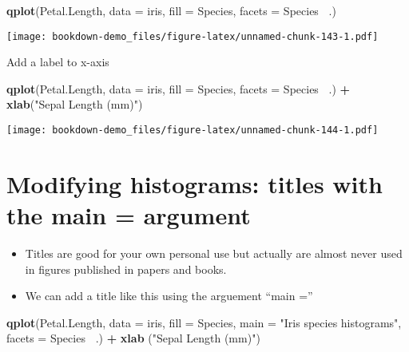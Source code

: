 \documentclass[]{book}
\newenvironment{Shaded}{\begin{snugshade}}{\end{snugshade}}
\newcommand{\KeywordTok}[1]{\textcolor[rgb]{0.13,0.29,0.53}{\textbf{#1}}}
\newcommand{\DataTypeTok}[1]{\textcolor[rgb]{0.13,0.29,0.53}{#1}}
\newcommand{\StringTok}[1]{\textcolor[rgb]{0.31,0.60,0.02}{#1}}
\newcommand{\OperatorTok}[1]{\textcolor[rgb]{0.81,0.36,0.00}{\textbf{#1}}}
\newcommand{\NormalTok}[1]{#1}
\providecommand{\tightlist}{%
  \setlength{\itemsep}{0pt}\setlength{\parskip}{0pt}}
\theoremstyle{definition}
\theoremstyle{definition}
\theoremstyle{definition}
\theoremstyle{remark}
\begin{document}
\begin{Shaded}
\begin{Highlighting}[]
\KeywordTok{qplot}\NormalTok{(Petal.Length,}
      \DataTypeTok{data =}\NormalTok{ iris,}
      \DataTypeTok{fill =}\NormalTok{ Species,}
      \DataTypeTok{facets =}\NormalTok{ Species }\OperatorTok{~}\NormalTok{.) }
\end{Highlighting}
\end{Shaded}

\texttt{[image: bookdown-demo\_files/figure-latex/unnamed-chunk-143-1.pdf]}

Add a label to x-axis

\begin{Shaded}
\begin{Highlighting}[]
\KeywordTok{qplot}\NormalTok{(Petal.Length,}
      \DataTypeTok{data =}\NormalTok{ iris,}
      \DataTypeTok{fill =}\NormalTok{ Species,}
      \DataTypeTok{facets =}\NormalTok{ Species }\OperatorTok{~}\NormalTok{.) }\OperatorTok{+}\StringTok{  }
\StringTok{  }\KeywordTok{xlab}\NormalTok{(}\StringTok{"Sepal Length (mm)"}\NormalTok{)}
\end{Highlighting}
\end{Shaded}

\texttt{[image: bookdown-demo\_files/figure-latex/unnamed-chunk-144-1.pdf]}

\section{Modifying histograms: titles with the main =
argument}\label{modifying-histograms-titles-with-the-main-argument}

\begin{itemize}
\tightlist
\item
  Titles are good for your own personal use but actually are almost
  never used in figures published in papers and books.
\item
  We can add a title like this using the arguement ``main =''
\end{itemize}

\begin{Shaded}
\begin{Highlighting}[]
\KeywordTok{qplot}\NormalTok{(Petal.Length,}
      \DataTypeTok{data =}\NormalTok{ iris,}
      \DataTypeTok{fill =}\NormalTok{ Species,}
      \DataTypeTok{main =} \StringTok{"Iris species histograms"}\NormalTok{,}
      \DataTypeTok{facets =}\NormalTok{ Species }\OperatorTok{~}\NormalTok{.) }\OperatorTok{+}\StringTok{  }
\StringTok{  }\KeywordTok{xlab}\NormalTok{ (}\StringTok{"Sepal Length (mm)"}\NormalTok{)}
\end{Highlighting}
\end{Shaded}
\end{document}
